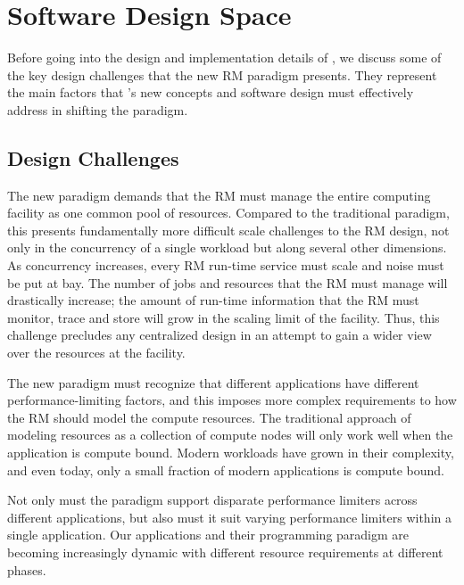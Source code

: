 \section{Software Design Space}
Before going into the design and implementation details
of \flux, we discuss some of the key design challenges
that the new RM paradigm presents. They represent
the main factors that \flux's new concepts and software
design must effectively address in shifting the paradigm.

\subsection{Design Challenges}
\vspace{1ex}
 The new paradigm
demands that the RM must manage the entire computing facility
as one common pool of resources. Compared to the traditional
paradigm, this presents fundamentally more difficult scale
challenges to the RM design, not only in the concurrency
of a single workload but along several other dimensions.
As concurrency increases, every RM run-time service must
scale and noise must be put at bay. The number of jobs
and resources that the RM must manage will drastically
increase; the amount of run-time information that the RM
must monitor, trace and store will grow in the scaling
limit of the facility. Thus, this challenge precludes
any centralized design in an attempt to gain a wider
view over the resources at the facility.

\vspace{1ex}
 The new paradigm must
recognize that different applications have different
performance-limiting factors, and this imposes more complex
requirements to how the RM should model the compute resources.
The traditional approach of modeling resources as a collection
of compute nodes will only work well when the application
is compute bound. Modern workloads have grown in their
complexity, and even today, only a small fraction
of modern applications is compute bound.

\vspace{1ex}
 Not only must the paradigm
support disparate performance limiters across different
applications, but also must it suit varying performance
limiters within a single application. Our applications
and their programming paradigm are becoming increasingly
dynamic with different resource requirements at different phases.

